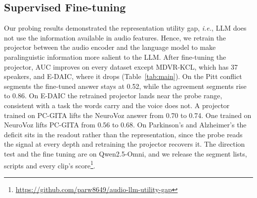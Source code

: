 \documentclass{article}
\begin{document}
\subsection{Supervised Fine-tuning}  
Our probing results demonstrated the representation utility gap, \textit{i.e.}, LLM does not use the information available in audio features. Hence, we retrain the projector between the audio encoder and the language model to make paralinguistic information more salient to the LLM. After fine-tuning the projector, AUC improves on every dataset except MDVR-KCL, which has 37 speakers, and E-DAIC, where it drops (Table~\ref{tab:main}). On the Pitt conflict segments the fine-tuned answer stays at 0.52, while the agreement segments rise to 0.86. On E-DAIC the retrained projector lands near the probe range, consistent with a task the words carry and the voice does not. A projector trained on PC-GITA lifts the NeuroVoz answer from 0.70 to 0.74. One trained on NeuroVoz lifts PC-GITA from 0.56 to 0.68. On Parkinson's and Alzheimer's the deficit sits in the readout rather than the representation, since the probe reads the signal at every depth and retraining the projector recovers it. The direction test and the fine tuning are on Qwen2.5-Omni, and we release the segment lists, scripts and every clip's score\footnote{\url{https://github.com/parw8649/audio-llm-utility-gap}}.


\end{document}
